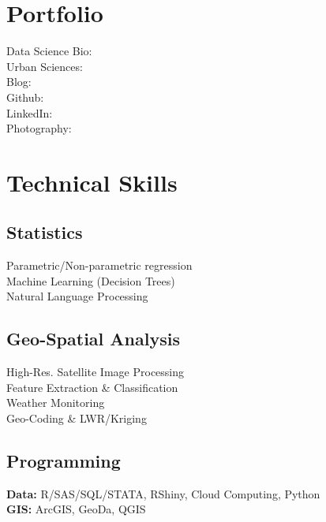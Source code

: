 \documentclass[]{deedy-resume-openfont}
\begin{document}
\begin{minipage}[t]{0.33\textwidth}
\section{Portfolio}
Data Science Bio:
\href{https://parthkhare.github.io/}{} \\
Urban Sciences:
\href{https://parthakhare.carto.com/viz/8c4d97e0-6510-11e6-ad84-0ef24382571b/embed_map}{} \\
Blog:
\href{https://rutilitykit.wordpress.com/about/}{}\\
Github: \href{https://github.com/parthkhare?tab=repositories}{} \\
LinkedIn: \href{https://www.linkedin.com/profile/view?id=43877647&trk=nav_responsive_tab_profile}{} \\
Photography:\href{http://parthkhare.format.com/}{} \\
\sectionsep


\section{Technical Skills}
\subsection{Statistics}
Parametric/Non-parametric regression \\
Machine Learning (Decision Trees) \\
Natural Language Processing \\
\sectionsep

\subsection{Geo-Spatial Analysis}
High-Res. Satellite Image Processing \\
Feature Extraction \& Classification \\
Weather Monitoring\\
Geo-Coding \& LWR/Kriging \\
\sectionsep


\subsection{Programming}
\textbf{Data:} R/SAS/SQL/STATA, RShiny, Cloud Computing, Python\\
\textbf{GIS:} ArcGIS, GeoDa, QGIS \\
\sectionsep


\end{minipage}
\end{document}
